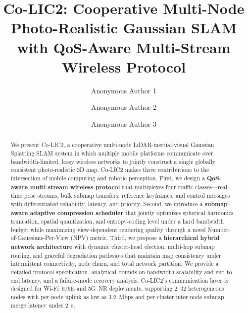 \documentclass[sigconf, 10pt, review, anonymous]{acmart}
\begin{document}
\title{Co-LIC2: Cooperative Multi-Node Photo-Realistic Gaussian SLAM%
\texorpdfstring{\\}{ }with QoS-Aware Multi-Stream Wireless Protocol}

\author{Anonymous Author 1}

\author{Anonymous Author 2}

\author{Anonymous Author 3}

\renewcommand{\shortauthors}{Anonymous}

\begin{abstract}
We present Co-LIC2, a cooperative multi-node LiDAR-inertial-visual Gaussian
Splatting SLAM system in which multiple mobile platforms communicate over
bandwidth-limited, lossy wireless networks to jointly construct a single
globally consistent photo-realistic 3D map. Co-LIC2 makes three contributions to
the intersection of mobile computing and robotic perception. First, we design a
\textbf{QoS-aware multi-stream wireless protocol} that multiplexes four traffic
classes---real-time pose streams, bulk submap transfers, reference keyframes,
and control messages---with differentiated reliability, latency, and priority.
Second, we introduce a \textbf{submap-aware adaptive compression scheduler} that
jointly optimizes spherical-harmonics truncation, spatial quantization, and
entropy-coding level under a hard bandwidth budget while maximizing
view-dependent rendering quality through a novel Number-of-Gaussians-Per-View
(NPV) metric. Third, we propose a \textbf{hierarchical hybrid network
architecture} with dynamic cluster-head election, multi-hop submap routing, and
graceful degradation pathways that maintain map consistency under intermittent
connectivity, node churn, and total network partition. We provide a detailed
protocol specification, analytical bounds on bandwidth scalability and
end-to-end latency, and a failure-mode recovery analysis. Co-LIC2's
communication layer is designed for Wi-Fi~6/6E and 5G~NR deployments, supporting
2--32 heterogeneous nodes with per-node uplink as low as 3.2~Mbps and per-cluster
inter-node submap merge latency under 2~s.
\end{abstract}
\end{document}
